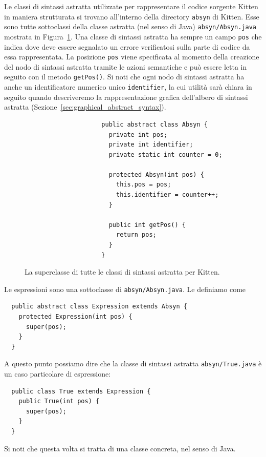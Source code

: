 Le classi di sintassi astratta utilizzate
per rappresentare il codice sorgente Kitten in maniera strutturata si trovano
all'interno della directory \texttt{absyn} di Kitten.
Esse sono tutte sottoclassi della classe astratta
(nel senso di Java) \texttt{absyn/Absyn.java} mostrata in
Figura~\ref{fig:absyn.Absyn}.
Una classe di sintassi astratta ha sempre un campo \texttt{pos} che
indica dove deve essere segnalato un errore verificatosi sulla parte di codice
da essa rappresentata. La posizione \texttt{pos} viene specificata
al momento della creazione del nodo di sintassi astratta tramite le azioni
semantiche e pu\`o essere letta in seguito con il metodo \texttt{getPos()}.
Si noti che ogni nodo di sintassi
astratta ha anche un identificatore numerico unico \texttt{identifier},
la cui utilit\`a sar\`a chiara in seguito quando descriveremo la
rappresentazione grafica dell'albero di sintassi astratta
(Sezione~\ref{sec:graphical_abstract_syntax}).
%
\begin{figure}[t]
\begin{verbatim}
                     public abstract class Absyn {
                       private int pos;
                       private int identifier;
                       private static int counter = 0;

                       protected Absyn(int pos) {
                         this.pos = pos;
                         this.identifier = counter++;
                       }

                       public int getPos() {
                         return pos;
                       }
                     }
\end{verbatim}
\caption{La superclasse di tutte le classi di sintassi astratta per Kitten.}
  \label{fig:absyn.Absyn}
\end{figure}

Le espressioni sono una sottoclasse di \texttt{absyn/Absyn.java}.
Le definiamo come
%
\begin{verbatim}
  public abstract class Expression extends Absyn {
    protected Expression(int pos) {
      super(pos);
    }
  }
\end{verbatim}
%
A questo punto possiamo dire che la classe di sintassi astratta
\texttt{absyn/True.java} \`e un caso particolare di espressione:
%
\begin{verbatim}
  public class True extends Expression {
    public True(int pos) {
      super(pos);
    }
  }
\end{verbatim}
%
Si noti che questa volta si tratta di una classe concreta, nel senso di Java.

